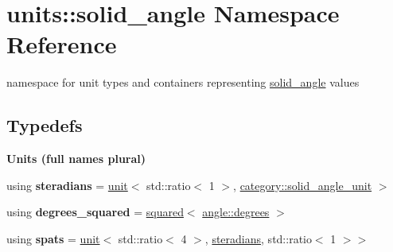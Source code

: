 \hypertarget{namespaceunits_1_1solid__angle}{}\section{units\+:\+:solid\+\_\+angle Namespace Reference}
\label{namespaceunits_1_1solid__angle}


namespace for unit types and containers representing \hyperlink{namespaceunits_1_1solid__angle}{solid\+\_\+angle} values  


\subsection*{Typedefs}
\begin{Indent}{\bf Units (full names plural)}\par
\begin{DoxyCompactItemize}
\item 
\hypertarget{namespaceunits_1_1solid__angle_a57260833047fb2e9974f7ae86a058c9e}{}using {\bfseries steradians} = \hyperlink{structunits_1_1unit}{unit}$<$ std\+::ratio$<$ 1 $>$, \hyperlink{namespaceunits_1_1category_ac288b5181dd5ed221d8d070b5d36137d}{category\+::solid\+\_\+angle\+\_\+unit} $>$\label{namespaceunits_1_1solid__angle_a57260833047fb2e9974f7ae86a058c9e}

\item 
\hypertarget{namespaceunits_1_1solid__angle_a9b03e6ec58f0fd491fc057917850e2fa}{}using {\bfseries degrees\+\_\+squared} = \hyperlink{group___unit_manipulators_ga636346f7898c35eb98a796bec1d77fb2}{squared}$<$ \hyperlink{structunits_1_1unit}{angle\+::degrees} $>$\label{namespaceunits_1_1solid__angle_a9b03e6ec58f0fd491fc057917850e2fa}

\item 
\hypertarget{namespaceunits_1_1solid__angle_a526382ad79dc5d8737aa141fc856a8f8}{}using {\bfseries spats} = \hyperlink{structunits_1_1unit}{unit}$<$ std\+::ratio$<$ 4 $>$, \hyperlink{structunits_1_1unit}{steradians}, std\+::ratio$<$ 1 $>$$>$\label{namespaceunits_1_1solid__angle_a526382ad79dc5d8737aa141fc856a8f8}

\end{DoxyCompactItemize}
\end{Indent}
